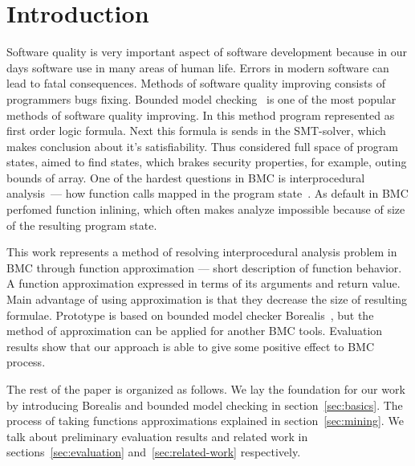 \section{Introduction}
Software quality is very important aspect of software development because in our days software use in many areas of human life. Errors in modern software can lead to fatal consequences. Methods of software quality improving consists of programmers bugs fixing. Bounded model checking~\cite{biere2003bounded} is one of the most popular methods of software quality improving. In this method program represented as first order logic formula. Next this formula is sends in the SMT-solver, which makes conclusion about it's satisfiability. Thus considered full space of program states, aimed to find states, which brakes security properties, for example, outing bounds of array. One of the hardest questions in BMC is interprocedural analysis~--- how function calls mapped in the program state~\cite{InterprocIsHard}. As default in BMC perfomed function inlining, which often makes analyze impossible because of size of the resulting program state.

This work represents a method of resolving interprocedural analysis problem in BMC through function approximation --- short description of function behavior. A function approximation expressed in terms of its arguments and return value. Main advantage of using approximation is that they decrease the size of resulting formulae. Prototype is based on bounded model checker Borealis~\cite{Borealis}, but the method of approximation can be applied for another BMC tools. Evaluation results show that our approach is able to give some positive effect to BMC process.

The rest of the paper is organized as follows. We lay the foundation for our work by introducing Borealis and bounded model checking in section~\ref{sec:basics}. The process of taking functions approximations explained in section~\ref{sec:mining}. We talk about preliminary evaluation results and related work in sections~\ref{sec:evaluation} and~\ref{sec:related-work} respectively.
